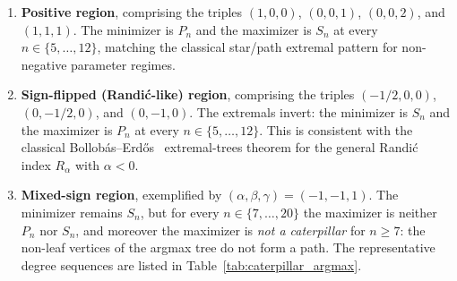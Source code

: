 \documentclass[a5paper, 10pt]{article}
\theoremstyle{plain}
\theoremstyle{remark}
\theoremstyle{definition}
\begin{document}
\begin{enumerate}[label=(\alph*)]
\item \textbf{Positive region}, comprising the triples $(1, 0, 0)$,
$(0, 0, 1)$, $(0, 0, 2)$, and $(1, 1, 1)$. The minimizer is $P_n$
and the maximizer is $S_n$ at every $n \in \{5, \ldots, 12\}$,
matching the classical star/path extremal pattern for non-negative
parameter regimes.

\item \textbf{Sign-flipped (Randi\'c-like) region}, comprising
the triples $(-1/2, 0, 0)$, $(0, -1/2, 0)$, and $(0, -1, 0)$. The
extremals invert: the minimizer is $S_n$ and the maximizer is
$P_n$ at every $n \in \{5, \ldots, 12\}$. This is consistent with
the classical Bollob\'as--Erd\H{o}s~\cite{BollobasErdos1998}
extremal-trees theorem for the general Randi\'c index
$R_{\alpha}$ with $\alpha < 0$.

\item \textbf{Mixed-sign region}, exemplified by
$(\alpha, \beta, \gamma) = (-1, -1, 1)$. The minimizer remains
$S_n$, but for every $n \in \{7, \ldots, 20\}$ the maximizer is
neither $P_n$ nor $S_n$, and moreover the maximizer is
\emph{not a caterpillar} for $n \ge 7$: the non-leaf vertices of
the argmax tree do not form a path. The representative degree
sequences are listed in Table~\ref{tab:caterpillar_argmax}.
\end{enumerate}
\end{document}
